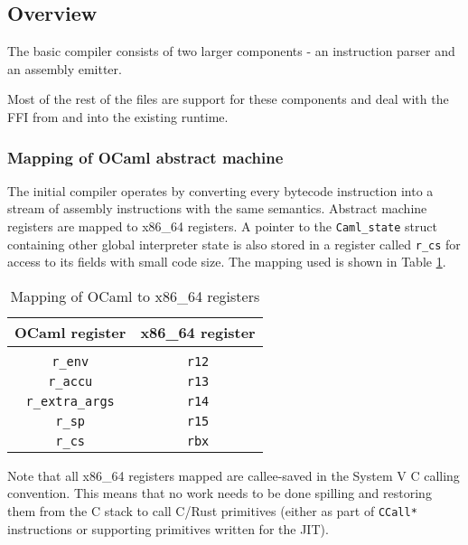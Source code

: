 \subsection{Overview}

The basic compiler consists of two larger components - an instruction parser and an assembly
emitter.

Most of the rest of the files are support for these components and deal with the FFI from and into
the existing runtime.

\subsubsection{Mapping of OCaml abstract machine}

The initial compiler operates by converting every bytecode instruction into a stream of assembly
instructions with the same semantics. Abstract machine registers are mapped to x86\_64 registers. A
pointer to the \texttt{Caml\_state} struct containing other global interpreter state is also
stored in a register called \texttt{r\_cs} for access to its fields with small code size. The
mapping used is shown in Table \ref{table:regmap}.

\begin{table}[h]
      \centering
      \begin{tabular}{cc}\toprule
            OCaml register          & x86\_64 register \\
            \midrule                                   \\
            \texttt{r\_env}         & \texttt{r12}     \\
            \texttt{r\_accu}        & \texttt{r13}     \\
            \texttt{r\_extra\_args} & \texttt{r14}     \\
            \texttt{r\_sp}          & \texttt{r15}     \\
            \texttt{r\_cs}          & \texttt{rbx}     \\
            \bottomrule
      \end{tabular}

      \caption{Mapping of OCaml to x86\_64 registers}
      \label{table:regmap}
\end{table}

Note that all x86\_64 registers mapped are callee-saved in the System V C calling convention. This
means that no work needs to be done spilling and restoring them from the C stack to call C/Rust
primitives (either as part of \texttt{CCall*} instructions or supporting primitives written for the
JIT).

